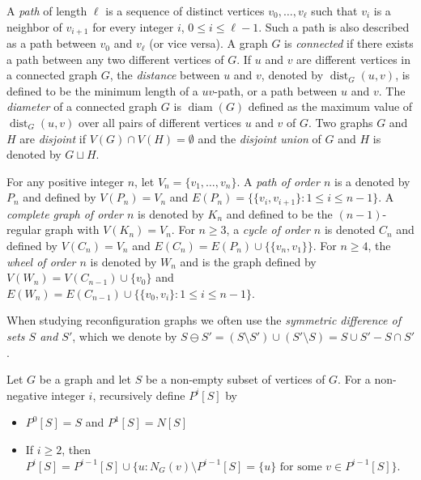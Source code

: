 \documentclass{article}
\numberwithin{figure}{section}   %
\theoremstyle{definition}
\theoremstyle{definition}
\theoremstyle{definition}
\newcommand{\dist}{\operatorname{dist}}
\newcommand{\diam}{\operatorname{diam}}
\begin{document}
A \emph{path} of length $\ell$  is a sequence of distinct vertices $v_0,\ldots, v_{\ell}$ such that %
$v_i$ is a neighbor of $v_{i+1}$ for every integer $i$, $0\leq i\leq \ell -1$. Such a path is also described as a path between  $v_0$ and $v_\ell$ (or vice versa).  A graph $G$ is \emph{connected} if there exists a path between any two different vertices of $G$. If $u$ and $v$ are different vertices in a connected graph $G$, the \emph{distance} between $u$ and $v$, denoted by $\dist_G(u,v)$, is defined to be the minimum length of a $uv$-path, or a path between $u$ and $v$. The \emph{diameter} of a connected graph $G$ is $\diam(G)$ defined as the maximum value of $\dist_G(u,v)$ over all pairs of different vertices $u$ and $v$ of $G$.  Two graphs $G$ and $H$ are \emph{disjoint} if $V(G)\cap V(H)=\emptyset$ and the \emph{disjoint union} of $G$ and $H$ is denoted by $G\sqcup H$.



For any positive integer $n$, let $V_n=\{v_1,\ldots, v_n\}$. A \emph{path of order $n$} is a denoted by $P_n$ and defined by $V(P_n)=V_n$  and $E(P_n)=\{\{v_i,v_{i+1}\}: 1\leq i\leq n-1\}$. A \emph{complete graph of order $n$} is denoted by $K_n$ and defined to be the $(n-1)$-regular graph with $V(K_n)=V_n$. For $n\geq 3$, a \emph{cycle of order $n$} is denoted $C_n$ and defined by $V(C_n)=V_n$ and $E(C_n)=E(P_n)\cup \{\{v_n,v_1\} \}$. For $n\geq 4$, the \emph{wheel of order $n$} is denoted by $W_n$ and is the graph defined by $V(W_n)=V(C_{n-1})\cup \{v_0\}$ and $E(W_n)=E(C_{n-1})\cup \{\{v_0,v_i\}: 1\leq i \leq n-1\}$.

When studying reconfiguration graphs we often use the \emph{symmetric  difference of sets $S$ and $S'$}, which we denote by   $S \ominus S'=(S\setminus S')\cup (S'\setminus S) =S \cup S' - S \cap S'$.


Let $G$ be a graph and let $S$ be a non-empty subset of vertices of $G$. For a non-negative integer $i$, recursively define $P^i[S]$ by 
\begin{itemize}
\item[1.] $P^0[S]=S$ and $P^1[S]=N[S]$ 
\item[2.] If $i\geq 2$, then $P^i[S]=P^{i-1}[S]\cup \{u: N_G(v)\setminus P^{i-1}[S] =\{u\} \mbox{ for some } v\in P^{i-1}[S] \}$.
\end{itemize}
\end{document}
